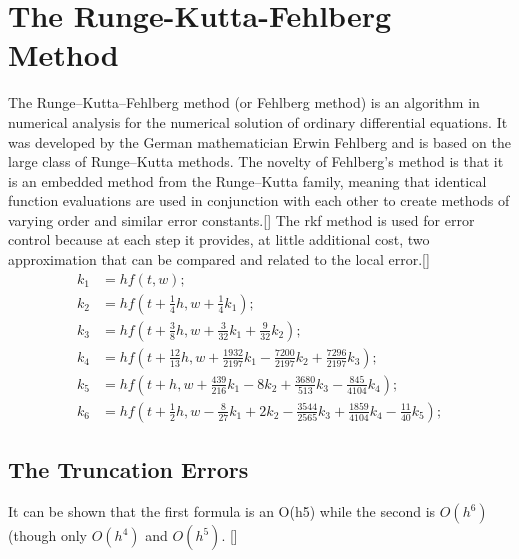 \documentclass[12pt,oneside]{book}
\begin{document}
	\section{The Runge-Kutta-Fehlberg Method} \label{m:rkf}
		\begin{spacing}{1.2}
			
			The Runge–Kutta–Fehlberg method (or Fehlberg method) is an algorithm in numerical analysis for the numerical solution of ordinary differential equations. It was developed by the German mathematician Erwin Fehlberg and is based on the large class of Runge–Kutta methods.
			The novelty of Fehlberg's method is that it is an embedded method from the Runge–Kutta family, meaning that identical function evaluations are used in conjunction with each other to create methods of varying order and similar error constants.[] The \ac{rkf} method is used for error control because at each step it provides, at little additional cost, two approximation that can be compared and related to the local error.[]
			\begin{equation}
				\begin{split}
					k_1 & = hf(t,w); \\
					k_2 & = hf(t + \frac{1}{4}h, w + \frac{1}{4}k_1); \\
					k_3 & = hf(t + \frac{3}{8}h, w + \frac{3}{32}k_1 + \frac{9}{32}k_2); \\ 
					k_4 & = hf(t + \frac{12}{13}h, w + \frac{1932}{2197}k_1 - \frac{7200}{2197}k_2 + \frac{7296}{2197}k_3); \\ 
					k_5 & = hf(t + h, w + \frac{439}{216}k_1 - 8k_2 + \frac{3680}{513}k_3 - \frac{845}{4104}k_4); \\
					k_6 & = hf(t + \frac{1}{2}h, w - \frac{8}{27}k_1 + 2k_2 - \frac{3544}{2565}k_3 + \frac{1859}{4104}k_4 - \frac{11}{40}k_5);
				\end{split}
			\end{equation}
			
			\subsection*{The Truncation Errors}
				It can be shown that the first formula is an O(h5) while the second is $ O(h^6) $ (though only $ O(h^4) $ and $ O(h^5) $. []
			

\end{spacing}
\end{document}
